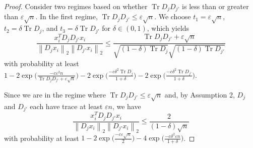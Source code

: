 \documentclass{article} %
\newcommand{\twonorm}[1]{\left\|#1\right\|_{2}}
\DeclareMathOperator{\Tr}{Tr}
\newcommand{\n}{\ensuremath{n}}
\newcommand{\1}{\ensuremath{{\sf (i)}}}
\newcommand{\2}{\ensuremath{{\sf (ii)}}}
\newcommand{\3}{\ensuremath{{\sf (iii)}}}
\newcommand{\4}{\ensuremath{{\sf (iv)}}}
\newcommand{\5}{\ensuremath{{\sf (v)}}}
\newcommand{\6}{\ensuremath{{\sf (vi)}}}
\begin{document}
\begin{proof}
Consider two regimes based on whether $\Tr{D_jD_{j'}}$ is less than or greater than $\varepsilon \sqrt{\n}$.
In the first regime, $\Tr{D_jD_{j'}} \leq \varepsilon \sqrt{\n}$. 
We choose $t_1 = \varepsilon\sqrt{\n}$, $t_2 = \delta\Tr{D_j}$, and $t_3 = \delta \Tr{D_{j'}}$ for $\delta \in (0,1)$, which yields
\begin{equation*}
    \frac{x_i^TD_jD_{j'}x_i}{\twonorm{D_jx_i}\twonorm{D_{j'}x_i}} \leq \frac{\Tr{D_jD_{j'}} + \varepsilon\sqrt{\n}}{\sqrt{(1-\delta)\Tr{D_j}}\sqrt{(1-\delta)\Tr{D_{j'}}}}
\end{equation*}
with probability at least $1 - 2\exp{\big(\frac{-c\varepsilon^2\n}{\Tr{D_jD_{j'}}+\varepsilon\sqrt{\n}}\big)} - 2\exp{\big(\frac{-c\delta^2\Tr{D_j}}{1+\delta}\big)} - 2\exp{\big(\frac{-c\delta^2 \Tr{D_{j'}}}{1+\delta}\big)}$. 

Since we are in the regime where $\Tr{D_jD_{j'}} \leq \varepsilon \sqrt{\n}$ and, by Assumption 2, $D_j$ and $D_{j'}$ each have trace at least $\varepsilon \n$, we have
\begin{equation*}
    \frac{x_i^TD_jD_{j'}x_i}{\twonorm{D_jx_i}\twonorm{D_{j'}x_i}} \leq \frac{2 }{(1-\delta) \sqrt{\n}}
\end{equation*}
with probability at least $1 - 2\exp{\big(\frac{-c\varepsilon\sqrt{\n}}{2}\big)} - 4\exp{\big(\frac{-c\delta^2\varepsilon \n}{1+\delta}\big)} $. 


\end{proof}
\end{document}
